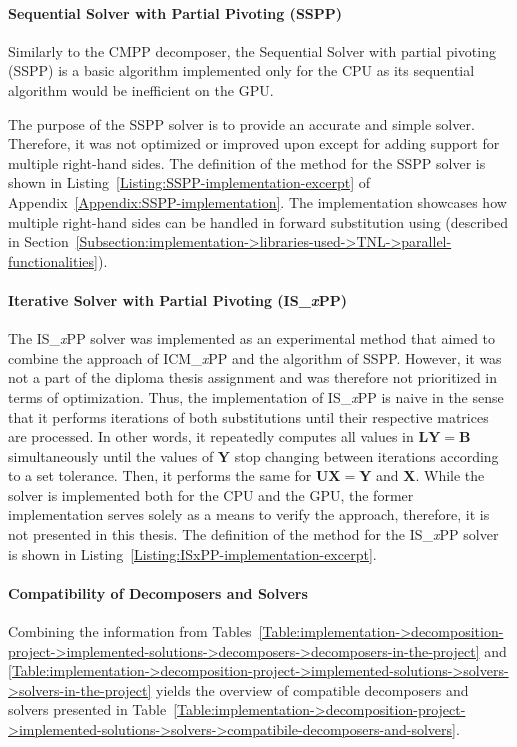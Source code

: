 \paragraph{Sequential Solver with Partial Pivoting (SSPP)} Similarly to the CMPP decomposer, the Sequential Solver with partial pivoting (SSPP) is a basic algorithm implemented only for the CPU as its sequential algorithm would be inefficient on the GPU.

The purpose of the SSPP solver is to provide an accurate and simple solver. Therefore, it was not optimized or improved upon except for adding support for multiple right-hand sides. The definition of the  method for the SSPP solver is shown in Listing~\ref{Listing:SSPP-implementation-excerpt} of Appendix~\ref{Appendix:SSPP-implementation}. The implementation showcases how multiple right-hand sides can be handled in forward substitution using  (described in Section~\ref{Subsection:implementation->libraries-used->TNL->parallel-functionalities}).

\paragraph{Iterative Solver with Partial Pivoting (IS\_\textit{x}PP)} The IS\_\textit{x}PP solver was implemented as an experimental method that aimed to combine the approach of ICM\_\textit{x}PP and the algorithm of SSPP. However, it was not a part of the diploma thesis assignment and was therefore not prioritized in terms of optimization. Thus, the implementation of IS\_\textit{x}PP is naive in the sense that it performs iterations of both substitutions until their respective matrices are processed. In other words, it repeatedly computes all values in $\mathbf{LY} = \mathbf{B}$ simultaneously until the values of $\mathbf{Y}$ stop changing between iterations according to a set tolerance. Then, it performs the same for $\mathbf{UX} = \mathbf{Y}$ and $\mathbf{X}$. While the solver is implemented both for the CPU and the GPU, the former implementation serves solely as a means to verify the approach, therefore, it is not presented in this thesis. The definition of the  method for the IS\_\textit{x}PP solver is shown in Listing~\ref{Listing:ISxPP-implementation-excerpt}.

\paragraph{Compatibility of Decomposers and Solvers} Combining the information from Tables~\ref{Table:implementation->decomposition-project->implemented-solutions->decomposers->decomposers-in-the-project} and \ref{Table:implementation->decomposition-project->implemented-solutions->solvers->solvers-in-the-project} yields the overview of compatible decomposers and solvers presented in Table~\ref{Table:implementation->decomposition-project->implemented-solutions->solvers->compatibile-decomposers-and-solvers}.

